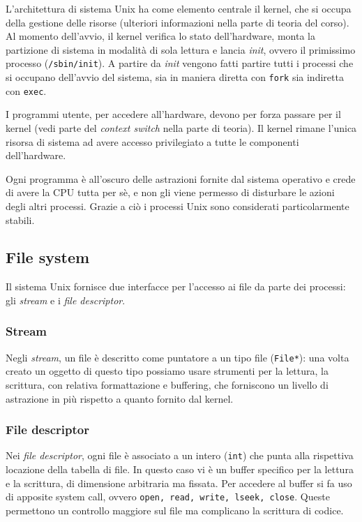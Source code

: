 \documentclass[11pt]{article}
\begin{document}
L'architettura di sistema Unix ha come elemento centrale il kernel, che si occupa della gestione delle risorse (ulteriori informazioni nella parte di teoria del corso). Al momento dell'avvio, il kernel verifica lo stato dell'hardware, monta la partizione di sistema in modalità di sola lettura e lancia \textit{init}, ovvero il primissimo processo (\verb|/sbin/init|). A partire da \textit{init} vengono fatti partire tutti i processi che si occupano dell'avvio del sistema, sia in maniera diretta con \verb|fork| sia indiretta con \verb|exec|.

I programmi utente, per accedere all'hardware, devono per forza passare per il kernel (vedi parte del \textit{context switch} nella parte di teoria). Il kernel rimane l'unica risorsa di sistema ad avere accesso privilegiato a tutte le componenti dell'hardware.

Ogni programma è all'oscuro delle astrazioni fornite dal sistema operativo e crede di avere la CPU tutta per sè, e non gli viene permesso di disturbare le azioni degli altri processi. Grazie a ciò i processi Unix sono considerati particolarmente stabili.

\subsection{File system}

Il sistema Unix fornisce due interfacce per l'accesso ai file da parte dei processi: gli \textit{stream} e i \textit{file descriptor}.

\subsubsection{Stream}

Negli \textit{stream}, un file è descritto come puntatore a un tipo file (\verb|File*|): una volta creato un oggetto di questo tipo possiamo usare strumenti per la lettura, la scrittura, con relativa formattazione e buffering, che forniscono un livello di astrazione in più rispetto a quanto fornito dal kernel.

\subsubsection{File descriptor}

Nei \textit{file descriptor}, ogni file è associato a un intero (\verb|int|) che punta alla rispettiva locazione della tabella di file. In questo caso vi è un buffer specifico per la lettura e la scrittura, di dimensione arbitraria ma fissata. Per accedere al buffer si fa uso di apposite system call, ovvero \verb|open, read, write, lseek, close|. Queste permettono un controllo maggiore sul file ma complicano la scrittura di codice.
\end{document}
